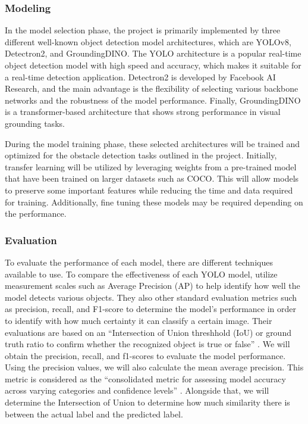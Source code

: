 \documentclass[stu,12pt,floatsintext]{apa7}
\begin{document}

\subsubsection{Modeling}

In the model selection phase, the project is primarily implemented by three different well-known object detection model architectures, which are YOLOv8, Detectron2, and GroundingDINO. The YOLO architecture is a popular real-time object detection model with high speed and accuracy, which makes it suitable for a real-time detection application. Detectron2 is developed by Facebook AI Research, and the main advantage is the flexibility of selecting various backbone networks and the robustness of the model performance. Finally, GroundingDINO is a transformer-based architecture that shows strong performance in visual grounding tasks. 

During the model training phase, these selected architectures will be trained and optimized for the obstacle detection tasks outlined in the project. Initially, transfer learning will be utilized by leveraging weights from a pre-trained model that have been trained on larger datasets such as COCO. This will allow models to preserve some important features while reducing the time and data required for training. Additionally, fine tuning these models may be required depending on the performance.



\subsubsection{Evaluation}
To evaluate the performance of each model, there are different techniques available to use. To compare the effectiveness of each YOLO model, \textcite{quach_evaluating_2023} utilize measurement scales such as Average Precision (AP) to help identify how well the model detects various objects. They also other standard evaluation metrics such as precision, recall, and F1-score to determine the model's performance in order to identify with how much certainty it can classify a certain image. Their evaluations are based on an ``Intersection of Union threshhold (IoU) or ground truth ratio to confirm whether the recognized object is true or false'' \parencite{quach_evaluating_2023}. We will obtain the precision, recall, and f1-scores to evaluate the model performance. Using the precision values, we will also calculate the mean average precision. This metric is considered as the ``consolidated metric for assessing model accuracy across varying categories and confidence levels'' \parencite{safaldin_improved_2024}. Alongside that, we will determine the Intersection of Union to determine how much similarity there is between the actual label and the predicted label. 
\end{document}
